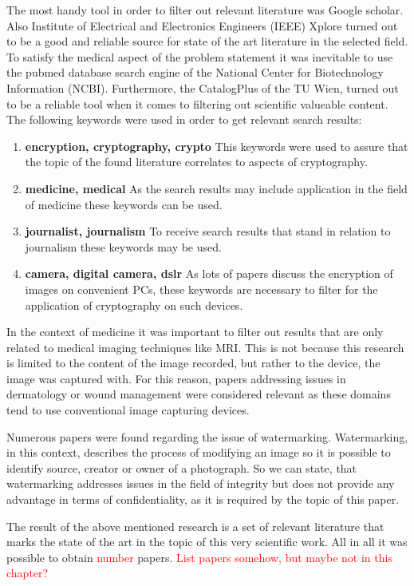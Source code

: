 \documentclass[12pt,a4paper,titlepage,oneside]{scrartcl}
\newcommand\todo[1]{\textcolor{red}{#1}}
\begin{document}
The most handy tool in order to filter out relevant literature was Google scholar. 
Also Institute of Electrical and Electronics Engineers (IEEE) Xplore turned out to be a good and reliable source for state of the art literature in the selected field.
To satisfy the medical aspect of the problem statement it was inevitable to use the pubmed database search engine of the National Center for Biotechnology Information (NCBI).
Furthermore, the CatalogPlus of the TU Wien, turned out to be a reliable tool when it comes to filtering out scientific valueable content.
The following keywords were used in order to get relevant search results:
\begin{enumerate}
  \item  \textbf{encryption, cryptography, crypto}
  This keywords were used to assure that the topic of the found literature correlates to aspects of cryptography.
  \item  \textbf{medicine, medical}
  As the search results may include application in the field of medicine these keywords can be used.
  \item  \textbf{journalist, journalism}
  To receive search results that stand in relation to journalism these keywords may be used.
  \item \textbf{camera, digital camera, dslr}
  As lots of papers discuss the encryption of images on convenient PCs, these keywords are necessary to filter for the application of cryptography on such devices.
\end{enumerate}

In the context of medicine it was important to filter out results that are only related to medical imaging techniques like MRI.
This is not because this research is limited to the content of the image recorded, but rather to the device, the image was captured with.
For this reason, papers addressing issues in dermatology or wound management were considered relevant as these domains tend to use conventional image capturing devices.

Numerous papers were found regarding the issue of watermarking.
Watermarking, in this context, describes the process of modifying an image so it is possible to identify source, creator or owner of a photograph.
So we can state, that watermarking addresses issues in the field of integrity but does not provide any advantage in terms of confidentiality, as it is required by the topic of this paper.

The result of the above mentioned research is a set of relevant literature that marks the state of the art in the topic of this very scientific work.
All in all it was possible to obtain \todo{number} papers.
\todo{List papers somehow, but maybe not in this chapter?}
\end{document}

